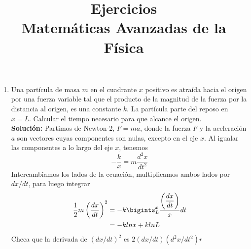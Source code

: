 
\usepackage{mathrsfs}
\usepackage{bigints}
\title{Ejercicios \\ {\large Matemáticas Avanzadas de la Física}}
\date{ }

\renewcommand\labelenumii{\theenumi.{\arabic{enumii}}}
\maketitle
\fontsize{14}{14}\selectfont
\begin{enumerate}
\item Una partícula de masa $m$ en el cuadrante $x$ positivo es atraída hacia el origen por una fuerza variable tal que el producto de la magnitud de la fuerza por la distancia al origen, es una constante $k$. La partícula parte del reposo en $x=L$. Calcular el tiempo necesario para que alcance el origen.
\\
\textbf{Solución: } Partimos de Newton-2, $F=ma$, donde la fuerza $F$ y la aceleración $a$ son vectores cuyas componentes son nulas, excepto en el eje $x$. Al igualar las componentes a lo largo del eje $x$, tenemos
\[  - \dfrac{k}{x} = m \dfrac{d^{2} x}{d t^{2}} \]
Intercambiamos los lados de la ecuación, multiplicamos ambos lados por $dx/dt$, para luego integrar
\begin{eqnarray*}
\dfrac{1}{2} m \left( \dfrac{d x}{d t} \right)^{2} &= - k \bigints_{L}^{x} \dfrac{\left(\dfrac{dx}{dt}\right)}{x} dt \\
&= - k ln x + k ln L
\end{eqnarray*}
Checa que la derivada de $(dx/dt)^{2}$ es $2(dx/dt)(d^{2}x/dt^{2})r$

\end{enumerate}


